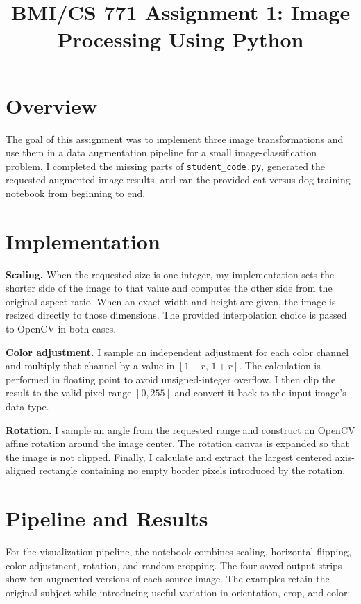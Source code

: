 \documentclass[10pt]{article}
\title{\vspace{-2em}BMI/CS 771 Assignment 1: Image Processing Using Python}
\author{}
\date{}
\begin{document}
\maketitle
\vspace{-2.5em}

\section*{Overview}
The goal of this assignment was to implement three image transformations and
use them in a data augmentation pipeline for a small image-classification
problem. I completed the missing parts of \texttt{student\_code.py}, generated
the requested augmented image results, and ran the provided cat-versus-dog
training notebook from beginning to end.

\section*{Implementation}
\textbf{Scaling.} When the requested size is one integer, my implementation
sets the shorter side of the image to that value and computes the other side
from the original aspect ratio. When an exact width and height are given, the
image is resized directly to those dimensions. The provided interpolation
choice is passed to OpenCV in both cases.

\textbf{Color adjustment.} I sample an independent adjustment for each color
channel and multiply that channel by a value in
$[1-r,\,1+r]$. The calculation is performed in floating point to avoid
unsigned-integer overflow. I then clip the result to the valid pixel range
$[0,255]$ and convert it back to the input image's data type.

\textbf{Rotation.} I sample an angle from the requested range and construct an
OpenCV affine rotation around the image center. The rotation canvas is expanded
so that the image is not clipped. Finally, I calculate and extract the largest
centered axis-aligned rectangle containing no empty border pixels introduced by
the rotation.

\section*{Pipeline and Results}
For the visualization pipeline, the notebook combines scaling, horizontal
flipping, color adjustment, rotation, and random cropping. The four saved
output strips show ten augmented versions of each source image. The examples
retain the original subject while introducing useful variation in orientation,
crop, and color:
\end{document}

